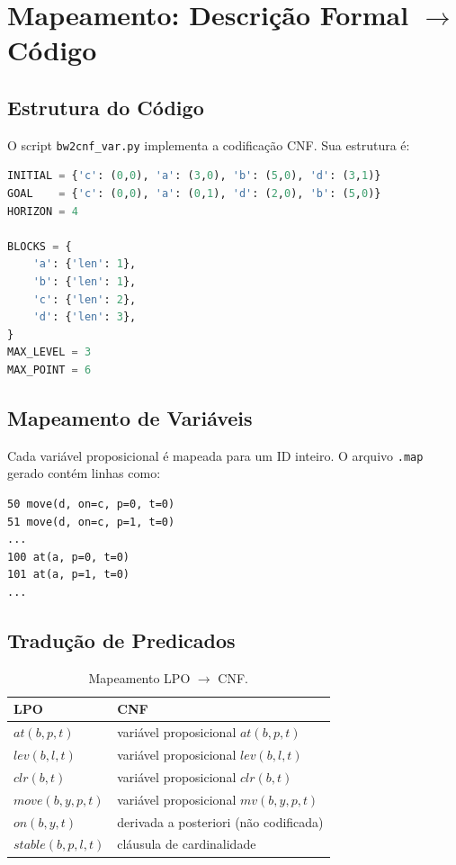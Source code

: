 \documentclass[12pt,a4paper]{article}
\begin{document}
\section{Mapeamento: Descrição Formal $\to$ Código}
\label{sec:mapeamento}

\subsection{Estrutura do Código}

O script \texttt{bw2cnf\_var.py} implementa a codificação CNF. Sua estrutura é:

\begin{lstlisting}[language=Python, caption={Configuração inicial do cenário.}]
INITIAL = {'c': (0,0), 'a': (3,0), 'b': (5,0), 'd': (3,1)}
GOAL    = {'c': (0,0), 'a': (0,1), 'd': (2,0), 'b': (5,0)}
HORIZON = 4

BLOCKS = {
    'a': {'len': 1},
    'b': {'len': 1},
    'c': {'len': 2},
    'd': {'len': 3},
}
MAX_LEVEL = 3
MAX_POINT = 6
\end{lstlisting}

\subsection{Mapeamento de Variáveis}

Cada variável proposicional é mapeada para um ID inteiro. O arquivo \texttt{.map} gerado contém linhas como:

\begin{lstlisting}[caption={Exemplo de arquivo .map.}]
50 move(d, on=c, p=0, t=0)
51 move(d, on=c, p=1, t=0)
...
100 at(a, p=0, t=0)
101 at(a, p=1, t=0)
...
\end{lstlisting}

\subsection{Tradução de Predicados}

\begin{table}[h!]
\centering
\begin{tabular}{@{}ll@{}}
\toprule
\textbf{LPO} & \textbf{CNF} \\
\midrule
$at(b,p,t)$ & variável proposicional $at(b,p,t)$ \\
$lev(b,l,t)$ & variável proposicional $lev(b,l,t)$ \\
$clr(b,t)$ & variável proposicional $clr(b,t)$ \\
$move(b,y,p,t)$ & variável proposicional $mv(b,y,p,t)$ \\
$on(b,y,t)$ & derivada a posteriori (não codificada) \\
$stable(b,p,l,t)$ & cláusula de cardinalidade \\
\bottomrule
\end{tabular}
\caption{Mapeamento LPO $\to$ CNF.}
\end{table}
\end{document}
